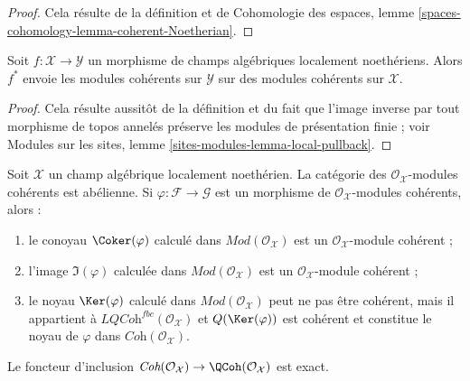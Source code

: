 \begin{proof}
Cela résulte de la définition et de
Cohomologie des espaces, lemme
\ref{spaces-cohomology-lemma-coherent-Noetherian}.
\end{proof}

\begin{lemma}
\label{lemma-pullback-coherent}
Soit $f : \mathcal{X} \to \mathcal{Y}$ un morphisme de champs algébriques
localement noethériens. Alors $f^*$ envoie les modules cohérents
sur $\mathcal{Y}$ sur des modules cohérents sur $\mathcal{X}$.
\end{lemma}

\begin{proof}
Cela résulte aussitôt de la définition et du fait que l'image inverse par tout
morphisme de topos annelés préserve les modules de présentation finie ; voir
Modules sur les sites, lemme \ref{sites-modules-lemma-local-pullback}.
\end{proof}

\begin{lemma}
\label{lemma-coherent-abelian-Noetherian}
Soit $\mathcal{X}$ un champ algébrique localement noethérien.
La catégorie des $\mathcal{O}_\mathcal{X}$-modules cohérents est abélienne.
Si $\varphi : \mathcal{F} \to \mathcal{G}$ est un morphisme
de $\mathcal{O}_\mathcal{X}$-modules cohérents, alors :
\begin{enumerate}
\item le conoyau $\Coker(\varphi)$ calculé dans
$\textit{Mod}(\mathcal{O}_\mathcal{X})$ est un
$\mathcal{O}_\mathcal{X}$-module cohérent ;
\item l'image $\Im(\varphi)$ calculée dans
$\textit{Mod}(\mathcal{O}_\mathcal{X})$ est un
$\mathcal{O}_\mathcal{X}$-module cohérent ;
\item le noyau $\Ker(\varphi)$ calculé dans
$\textit{Mod}(\mathcal{O}_\mathcal{X})$
peut ne pas être cohérent, mais il appartient à
$\textit{LQCoh}^{fbc}(\mathcal{O}_\mathcal{X})$ et $Q(\Ker(\varphi))$
est cohérent et constitue le noyau de $\varphi$ dans
$\textit{Coh}(\mathcal{O}_\mathcal{X})$.
\end{enumerate}
Le foncteur d'inclusion $\textit{Coh}(\mathcal{O}_\mathcal{X}) \to
\QCoh(\mathcal{O}_\mathcal{X})$ est exact.
\end{lemma}

